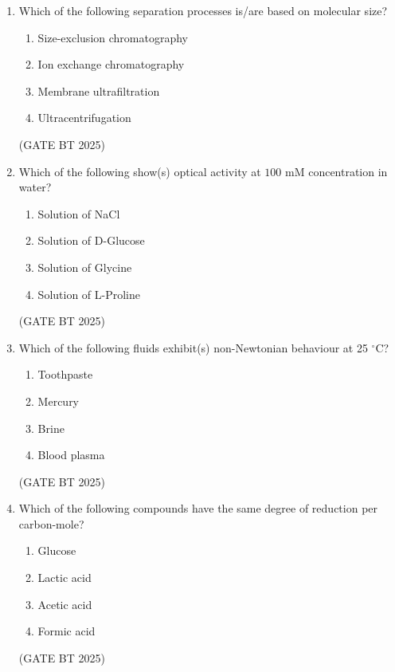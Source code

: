 \documentclass[journal,12pt,onecolumn]{IEEEtran}
\theoremstyle{remark}
\begin{document}
\begin{enumerate}
\item Which of the following separation processes is/are based on molecular size?  
\begin{multicols}{2}
\begin{enumerate}
    \item Size-exclusion chromatography
    \item Ion exchange chromatography
    \item Membrane ultrafiltration
    \item Ultracentrifugation
\end{enumerate}  
\end{multicols}
\hfill (GATE BT 2025)
\item Which of the following show(s) optical activity at $100$ mM concentration in water?  
\begin{multicols}{2}
\begin{enumerate}
    \item Solution of NaCl
    \item Solution of D-Glucose
    \item Solution of Glycine
    \item Solution of L-Proline
\end{enumerate}  
\end{multicols}
\hfill (GATE BT 2025)

\item Which of the following fluids exhibit(s) non-Newtonian behaviour at 25 $^\circ$C?  
\begin{multicols}{2}
\begin{enumerate}
    \item Toothpaste
    \item Mercury
    \item Brine
    \item Blood plasma
\end{enumerate}  
\end{multicols}
\hfill (GATE BT 2025)

\item Which of the following compounds have the same degree of reduction per carbon-mole?  
\begin{multicols}{2}
\begin{enumerate}
    \item Glucose
    \item Lactic acid
    \item Acetic acid
    \item Formic acid
\end{enumerate}  
\end{multicols}
\hfill (GATE BT 2025)


\end{enumerate}
\end{document}
